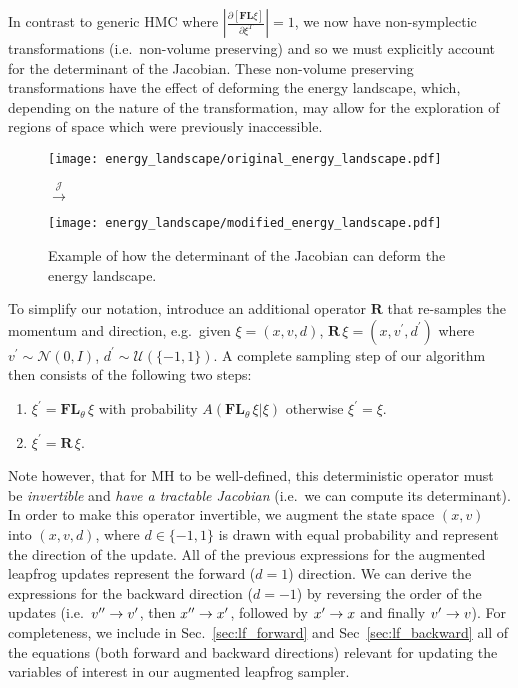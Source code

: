 In contrast to generic HMC where
$\left|\frac{\partial\left[\mathbf{F}\mathbf{L}\xi\right]}
{\partial\xi^{T}}\right| = 1$, we now have non-symplectic transformations
(i.e.\ non-volume preserving) and so we must explicitly account for the
determinant of the Jacobian.
%
These non-volume preserving transformations have the effect of deforming the
energy landscape, which, depending on the nature of the transformation, may
allow for the exploration of regions of space which were previously
inaccessible.
%
\newcommand{\energyA}{\texttt{[image: energy\_landscape/original\_energy\_landscape.pdf]}}
\newcommand{\energyB}{\texttt{[image: energy\_landscape/modified\_energy\_landscape.pdf]}}
%
\begin{figure}
  \centering 
  \Huge
  \parbox{\widthof{\energyA}}{\energyA} $\overset{\mathcal{J}}{\longrightarrow}$
  \parbox{\widthof{\energyB}}{\energyB} 
  \normalsize
  \caption{Example of how the determinant of the Jacobian can deform the energy landscape.}
\end{figure}

To simplify our notation, introduce an additional operator $\mathbf{R}$ that
re-samples the momentum and direction, e.g.\ given $\xi = (x, v, d)$,
$\mathbf{R}\,\xi = (x, v^{\prime}, d^{\prime})$ where $v^{\prime} \sim
\mathcal{N}(0, I)$, $d^{\prime} \sim \mathcal{U}\left(\{-1, 1\}\right)$.
%
A complete sampling step of our algorithm then consists of the following two
steps:
%
\begin{enumerate}
    \item $\xi^{\prime} = \mathbf{FL}_{\theta} \,\xi$ with probability
        $A(\mathbf{FL}_{\theta}\,\xi|\xi)$ %
        otherwise $\xi^{\prime} = \xi$.
    \item $\xi^{\prime} = \mathbf{R}\,\xi$.
\end{enumerate}
%
Note however, that for MH to be well-defined, this deterministic operator must
be \emph{invertible} and \emph{have a tractable Jacobian} (i.e.\ we can compute
its determinant).
%
In order to make this operator invertible, we augment the state space $(x, v)$
into $(x, v, d)$, where $d \in \{-1, 1\}$ is drawn with equal probability and
represent the direction of the update.
%
All of the previous expressions for the augmented leapfrog updates represent
the forward ($d = 1$) direction.
%
We can derive the expressions for the backward direction ($d = -1$) by
reversing the order of the updates (i.e.\ ${v^{\prime\prime}} \rightarrow {v^{\prime}}$, then ${x^{\prime\prime}}
\rightarrow {x^{\prime}}$, followed by ${x^{\prime}} \rightarrow x$ and finally ${v^{\prime}} \rightarrow
v$).
%
For completeness, we include in Sec.~\ref{sec:lf_forward} and
Sec~\ref{sec:lf_backward} all of the equations (both forward and backward
directions) relevant for updating the variables of interest in our augmented
leapfrog sampler.
